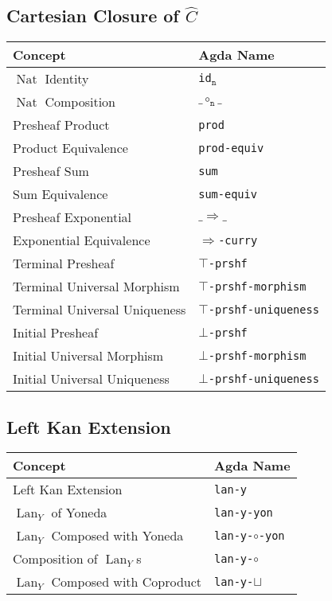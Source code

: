 \documentclass[12pt, parskip, DIV=14]{scrbook}
\renewcommand{\circ}{\vysmwhtcircle}
\newcommand{\Nat}{\operatorname{Nat}}
\newcommand{\Lan}{\operatorname{Lan}}
\begin{document}
\subsection{Cartesian Closure of $\widehat{C}$}

\begin{center}
\begin{tabular}{ll}
  Concept & Agda Name \\
  \hline
  $\Nat$ Identity & \texttt{id$_\texttt{n}$} \\
  $\Nat$ Composition & $\_\circ_\texttt{n}\_$ \\
  Presheaf Product & \texttt{prod} \\
  Product Equivalence & \texttt{prod-equiv} \\
  Presheaf Sum & \texttt{sum} \\
  Sum Equivalence & \texttt{sum-equiv} \\
  Presheaf Exponential & $\_\Rightarrow\_$ \\
  Exponential Equivalence & \texttt{$\Rightarrow$-curry} \\
  Terminal Presheaf & \texttt{$\top$-prshf} \\
  Terminal Universal Morphism & \texttt{$\top$-prshf-morphism} \\
  Terminal Universal Uniqueness & \texttt{$\top$-prshf-uniqueness} \\
  Initial Presheaf & \texttt{$\bot$-prshf} \\
  Initial Universal Morphism & \texttt{$\bot$-prshf-morphism} \\
  Initial Universal Uniqueness & \texttt{$\bot$-prshf-uniqueness} \\
\end{tabular}
\end{center}

\subsection{Left Kan Extension}

\begin{center}
\begin{tabular}{ll}
  Concept & Agda Name \\
  \hline
  Left Kan Extension & \texttt{lan-y} \\
  $\Lan_Y$ of Yoneda & \texttt{lan-y-yon} \\
  $\Lan_Y$ Composed with Yoneda & \texttt{lan-y-$\circ$-yon} \\
  Composition of $\Lan_Y$s & \texttt{lan-y-$\circ$} \\
  $\Lan_Y$ Composed with Coproduct & \texttt{lan-y-$\sqcup$} \\
\end{tabular}
\end{center}
\end{document}
